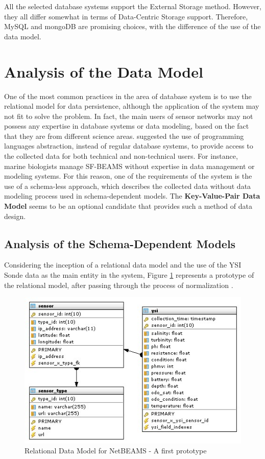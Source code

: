 All the selected database systems support the External Storage method. However,
they all differ somewhat in terms of Data-Centric Storage support. Therefore,
MySQL and mongoDB are promising choices, with the difference of the use of the data model.

\section{Analysis of the Data Model}

One of the most common practices in the area of database system is to use the
relational model for data persistence, although the application of the system
may not fit to solve the problem. In fact, the main users of sensor networks may
not possess any expertise in database systems or data modeling, based on the
fact that they are from different science areas. \cite{sn-programming-language}
suggested the use of programming languages abstraction, instead of regular
database systems, to provide access to the collected data for both
technical and non-technical users. For instance, marine biologists manage
SF-BEAMS without expertise in data management or modeling systems. For this
reason, one of the requirements of the system is the use of a schema-less
approach, which describes the collected data without data modeling process
used in schema-dependent models. The \textbf{Key-Value-Pair Data Model} seems
to be an optional candidate that provides such a method of data design.

\subsection{Analysis of the Schema-Dependent Models}

Considering the inception of a relational data model \cite{relational-model}
and the use of the YSI Sonde data as the main entity in the system, Figure
\ref{fig:Relational-Model-Original} represents a prototype of the relational 
model, after passing through the process of normalization
\cite{db-normalization}.

\begin{figure}[!t]
  \centering
  \includegraphics[scale=0.65]{../diagrams/Relational-Model-Original}
  \caption{Relational Data Model for NetBEAMS - A first prototype}
  \label{fig:Relational-Model-Original}
\end{figure}

